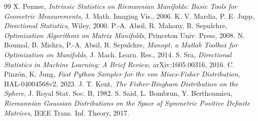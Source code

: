 \documentclass[11pt,a4paper]{article}
\begin{document}

\begin{thebibliography}{99}
 X. Pennec, \textit{Intrinsic Statistics on Riemannian Manifolds: Basic Tools for Geometric Measurements}, J. Math. Imaging Vis., 2006.
 K. V. Mardia, P. E. Jupp, \textit{Directional Statistics}, Wiley, 2000.
 P.-A. Absil, R. Mahony, R. Sepulchre, \textit{Optimization Algorithms on Matrix Manifolds}, Princeton Univ. Press, 2008.
 N. Boumal, B. Mishra, P.-A. Absil, R. Sepulchre, \textit{Manopt, a Matlab Toolbox for Optimization on Manifolds}, J. Mach. Learn. Res., 2014.
 S. Sra, \textit{Directional Statistics in Machine Learning: A Brief Review}, arXiv:1605.00316, 2016.
 C. Pinzón, K. Jung, \textit{Fast Python Sampler for the von Mises-Fisher Distribution}, HAL-04004568v2, 2023.
 J. T. Kent, \textit{The Fisher-Bingham Distribution on the Sphere}, J. Royal Stat. Soc. B, 1982.
 S. Said, L. Bombrun, Y. Berthoumieu, \textit{Riemannian Gaussian Distributions on the Space of Symmetric Positive Definite Matrices}, IEEE Trans. Inf. Theory, 2017.
\end{thebibliography}
\end{document}
